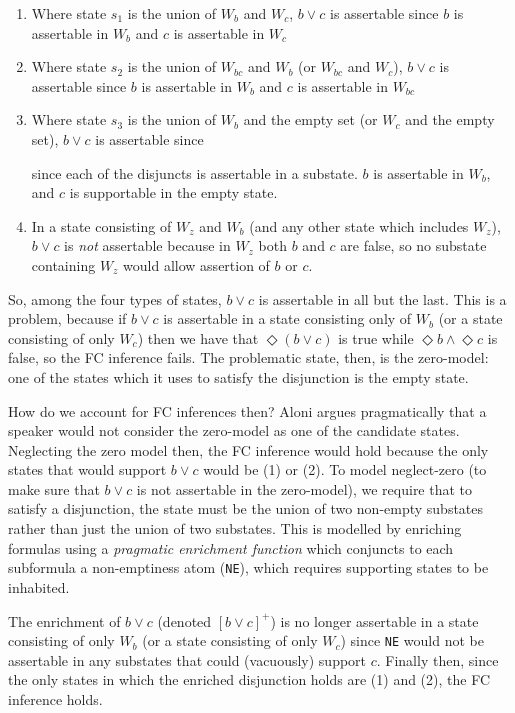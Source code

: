 \begin{enumerate}
\item Where state $s_1$ is the union of $W_b$ and $W_c$, $b\vee c$ is assertable since $b$ is assertable in $W_b$ and $c$ is assertable in $W_c$
\item Where state $s_2$ is the union of $W_{bc}$ and $W_b$ (or $W_{bc}$ and $W_c$), $b\vee c$ is assertable since $b$ is assertable in $W_b$ and $c$ is assertable in $W_{bc}$
\item Where state $s_3$ is the union of $W_b$ and the empty set (or $W_c$ and the empty set), $b\vee c$ is assertable since


since each of the
disjuncts is assertable in a substate. $b$ is assertable in $W_b$, and $c$ is supportable in the empty state.
\item In a state consisting of $W_z$ and $W_b$ (and any other state which includes $W_z$), $b\vee c$ is
\textit{not} assertable because in $W_z$ both $b$ and $c$ are false, so no substate containing $W_z$ would allow assertion of $b$ or $c$.
\end{enumerate}

So, among the four types of states, $b\vee c$ is assertable in all but the last. This is a problem, because if
$b\vee c$ is assertable in a state consisting only of $W_b$ (or a state consisting of only $W_c$) then we have
that $\Diamond(b\vee c)$ is true while $\Diamond b \wedge \Diamond c$ is false, so the FC inference fails. The
problematic state, then, is the zero-model: one of the states which it uses to satisfy the disjunction is the
empty state.

How do we account for FC inferences then? Aloni argues pragmatically that a speaker would not consider the
zero-model as one of the candidate states. Neglecting the zero model then, the FC inference would hold
because the only states that would support $b\vee c$ would be (1) or (2). To model neglect-zero (to make
sure that $b\vee c$ is not assertable in the zero-model), we require that to satisfy a disjunction, the state
must be the union of two non-empty substates rather than just the union of two substates.
This is modelled by enriching formulas using a \emph{pragmatic enrichment function} which conjuncts to each subformula a non-emptiness atom (\verb|NE|), which requires supporting states to be inhabited.

The enrichment of $b \vee c$ (denoted $[b\vee c]^+$) is no longer assertable in a state consisting of only $W_b$
(or a state consisting of only $W_c$) since \verb|NE| would not be assertable in any substates that could (vacuously) support $c$.
Finally then, since the only states in which the enriched disjunction holds are (1) and (2), the FC inference holds.

